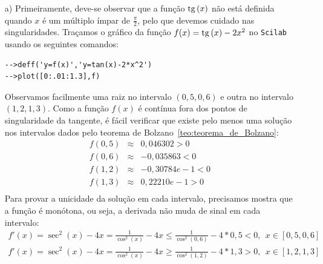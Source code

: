 \begin{resp}
  \begin{itemize}
\item[a)]Primeiramente, deve-se observar que a função $\operatorname{tg}\,(x)$ não está definida quando $x$ é um múltiplo ímpar de $\frac{\pi}{2}$, pelo que devemos cuidado nas singularidades. Traçamos o gráfico da função $f(x)=\operatorname{tg}\,(x)-2x^2$ no \verb+Scilab+ usando os seguintes comandos:
\begin{verbatim}
-->deff('y=f(x)','y=tan(x)-2*x^2')
-->plot([0:.01:1.3],f)
\end{verbatim}
Observamos facilmente uma raiz no intervalo $(0,5, 0,6)$ e outra no intervalo $(1,2, 1,3)$. Como a função $f(x)$ é contínua fora dos pontos de singularidade da tangente, é fácil verificar que existe pelo menos uma solução nos intervalos dados pelo teorema de Bolzano~\ref{teo:teorema_de_Bolzano}:
\begin{eqnarray}
f(0,5) &\approx& 0,046302 >0\\
f(0,6) &\approx& -0,035863 <0\\
f(1,2) &\approx& -0,30784e-1 <0\\
f(1,3) &\approx&  0,22210e-1>0\\
\end{eqnarray}
Para provar a unicidade da solução em cada intervalo, precisamos mostra que a função é monótona, ou seja, a derivada não muda de sinal em cada intervalo:
\begin{eqnarray}
f'(x)=\sec^2(x)-4x=\frac{1}{\cos^2(x)}-4x\leq \frac{1}{\cos^2(0,6)}-4*0,5<0, ~~x\in[ 0,5, 0,6]\\
f'(x)=\sec^2(x)-4x=\frac{1}{\cos^2(x)}-4x\geq \frac{1}{\cos^2(1,2)}-4*1,3>0, ~~x\in[ 1,2, 1,3]\\
\end{eqnarray}



\end{itemize}
\end{resp}
